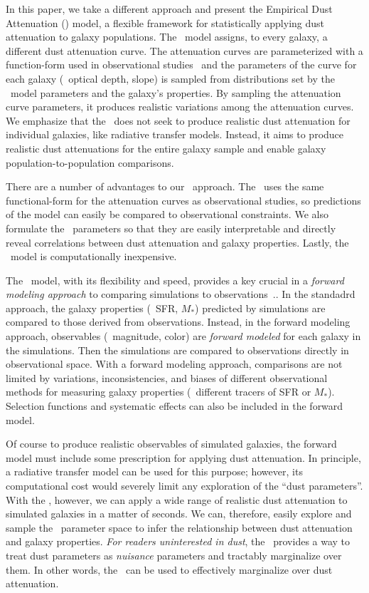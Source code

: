 In this paper, we take a different approach and present the Empirical Dust
Attenuation (\eda) model, a flexible framework for statistically applying dust
attenuation to galaxy populations. The \eda~model assigns, to every galaxy, a
different dust attenuation curve. The attenuation curves are parameterized with
a function-form used in observational studies~\citep{noll2009} and the
parameters of the curve for each galaxy (\eg~optical depth, slope) is sampled
from distributions set by the \eda~model parameters and the galaxy's properties.  
By sampling the attenuation curve parameters, it produces realistic variations 
among the attenuation curves. We emphasize that the \eda~does not seek to produce 
realistic dust attenuation for individual galaxies, like radiative transfer
models. Instead, it aims to produce realistic dust attenuations for the entire
galaxy sample and enable galaxy population-to-population comparisons.

There are a number of advantages to our \eda~approach. The \eda~uses the same
functional-form for the attenuation curves as observational studies, so
predictions of the model can easily be compared to observational constraints. 
We also formulate the \eda~parameters so that they are easily interpretable and
directly reveal correlations between dust attenuation and galaxy properties.
Lastly, the \eda~model is computationally inexpensive. 

The \eda~model, with its flexibility and speed, provides a key crucial in a
{\em forward modeling approach} to comparing simulations to
observations~\citep[\eg][]{nelson2018, baes2019, trcka2020, dickey2020}..
In the standadrd approach, the galaxy properties (\eg~SFR, $M_*$) predicted by
simulations are compared to those derived from observations. Instead, in the
forward modeling approach, observables (\eg~magnitude, color) are {\em forward
modeled} for each galaxy in the simulations. Then the simulations are compared 
to observations directly in observational space. With a forward modeling approach, 
comparisons are not limited by variations, inconsistencies, and biases of different
observational methods for measuring galaxy properties (\eg~different tracers of
SFR or $M_*$). Selection functions and systematic effects can also be included 
in the forward model. 

Of course to produce realistic observables of simulated galaxies, the forward
model must include some prescription for applying dust attenuation. In
principle, a radiative transfer model can be used for this purpose; however,
its computational cost would severely limit any exploration of the ``dust
parameters''. With the \eda, however, we can apply a wide range of realistic
dust attenuation to simulated galaxies in a matter of seconds. We can,
therefore, easily explore and sample the \eda~parameter space to infer the 
relationship between dust attenuation and galaxy properties. {\em For readers 
uninterested in dust}, the \eda~provides a way to treat dust parameters as
{\em nuisance} parameters and tractably marginalize over them. In other words, 
the \eda~can be used to effectively marginalize over dust attenuation. 

